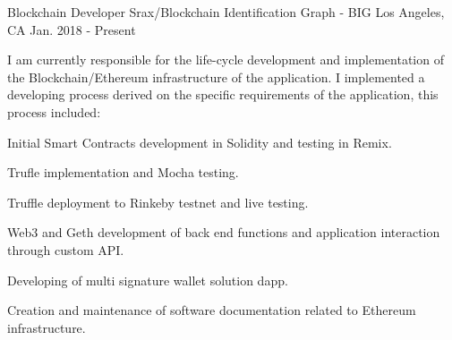 


\begin{cventries}


\cventry
{Blockchain Developer} %
{Srax/Blockchain Identification Graph - BIG} %
{Los Angeles, CA} %
{Jan. 2018 - Present} %
{ %
\begin{cvitems}
\item[] {I am currently responsible for the life-cycle development and implementation of the Blockchain/Ethereum infrastructure of the application. I implemented a developing process derived on the specific requirements of the application, this process included:} %
\item {Initial Smart Contracts development in Solidity and testing in Remix.}
\item {Trufle implementation and Mocha testing.}
\item {Truffle deployment to Rinkeby testnet and live testing.}
\item {Web3 and Geth development of back end functions and application interaction through custom API.}
\item {Developing of multi signature wallet solution dapp.}
\item {Creation and maintenance of software documentation related to Ethereum infrastructure.}
\end{cvitems}
}



\end{cventries}
